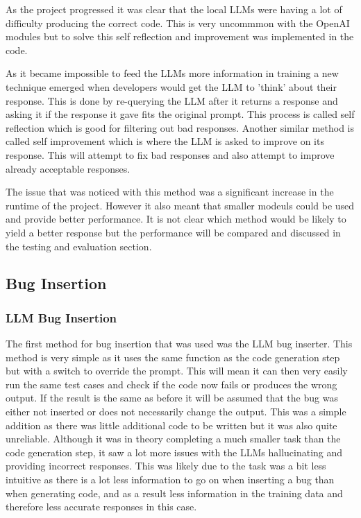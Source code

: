 \documentclass[12pt]{extarticle}
\begin{document}
As the project progressed it was clear that the local LLMs were having a lot of difficulty producing the correct code. This is very uncommmon with the OpenAI modules but to solve this self reflection and improvement was implemented in the code. 

As it became impossible to feed the LLMs more information in training a new technique emerged when developers would get the LLM to 'think' about their response. This is done by re-querying the LLM after it returns a response and asking it if the response it gave fits the original prompt. This process is called self reflection \cite{shinn2023} which is good for filtering out bad responses. Another similar method is called self improvement which is where the LLM is asked to improve on its response. This will attempt to fix bad responses and also attempt to improve already acceptable responses.

The issue that was noticed with this method was a significant increase in the runtime of the project. However it also meant that smaller modeuls could be used and provide better performance. It is not clear which method would be likely to yield a better response but the performance will be compared and discussed in the testing and evaluation section.

\subsection{Bug Insertion}
\subsubsection{LLM Bug Insertion}

The first method for bug insertion that was used was the LLM bug inserter. This method is very simple as it uses the same function as the code generation step but with a switch to override the prompt. This will mean it can then very easily run the same test cases and check if the code now fails or produces the wrong output. If the result is the same as before it will be assumed that the bug was either not inserted or does not necessarily change the output. This was a simple addition as there was little additional code to be written but it was also quite unreliable. Although it was in theory completing a much smaller task than the code generation step, it saw a lot more issues with the LLMs hallucinating and providing incorrect responses. This was likely due to the task was a bit less intuitive as there is a lot less information to go on when inserting a bug than when generating code, and as a result less information in the training data and therefore less accurate responses in this case.
\end{document}
